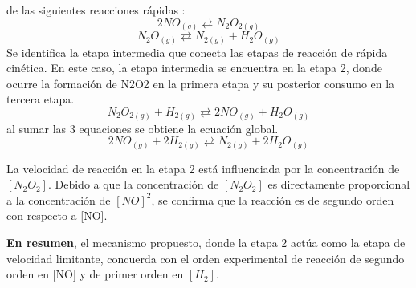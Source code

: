 \documentclass[11pt]{scrartcl}
\begin{document}
de las siguientes reacciones r\'apidas : 
\[
	2NO_{(g)} \rightleftarrows N_{2} O_{2(g)}
\]
\[
	N_{2} O_{(g)} \rightleftarrows N_{2(g)} + H_{2}O_{(g)}
\]
Se identifica la etapa intermedia que conecta las etapas de reacción de rápida cinética. En este caso, la etapa intermedia se encuentra en la etapa 2, donde ocurre la formación de N2O2 en la primera etapa y su posterior consumo en la tercera etapa.
\[
	N_{2} O_{2(g)} + H_{2(g)}\rightleftarrows 2NO_{(g)}  + H_{2}O_{(g)}
\]
al sumar las 3 equaciones se obtiene la ecuaci\'on global.
\[
	2NO_{(g)} + 2H_{2(g)} \rightleftarrows N_{2(g)} +2H_{2} O_{(g)}
\]

La velocidad de reacción en la etapa 2 está influenciada por la concentración de $ [ N_{2}O_{2} ] $. Debido a que la concentración de $[N_{2}O_{2}]$ es directamente proporcional a la concentración de $[NO]^2$, se confirma que la reacción es de segundo orden con respecto a [NO].

\textbf{En resumen}, el mecanismo propuesto, donde la etapa 2 actúa como la etapa de velocidad limitante, concuerda con el orden experimental de reacción de segundo orden en [NO] y de primer orden en $[H_{2}]$.
\end{document}
